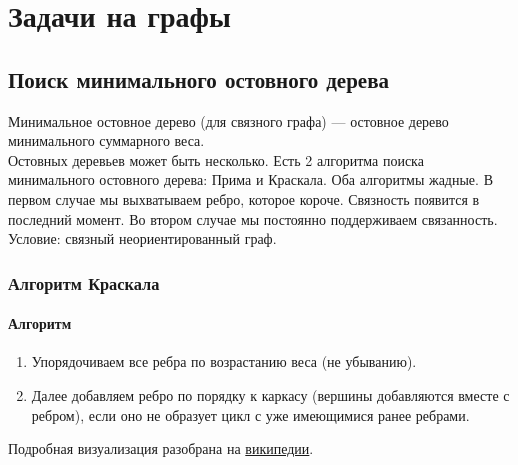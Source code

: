 \chapter{Задачи на графы}
\section{Поиск минимального остовного дерева}
Минимальное остовное дерево (для связного графа) --- остовное дерево минимального суммарного веса. \\
Остовных деревьев может быть несколько. Есть 2 алгоритма поиска минимального остовного дерева: Прима и Краскала. 
Оба алгоритмы жадные. В первом случае мы выхватываем ребро, которое короче. Связность появится в последний момент. Во втором случае мы постоянно поддерживаем связанность.
Условие: связный неориентированный граф.
\subsection{Алгоритм Краскала}
\subsubsection{Алгоритм}
\begin{enumerate}
\item Упорядочиваем все ребра по возрастанию веса (не убыванию).
\item Далее добавляем ребро по порядку к каркасу (вершины добавляются вместе с ребром), если оно не образует цикл с уже имеющимися  ранее ребрами.
\end{enumerate}
Подробная визуализация разобрана на \href{https://ru.wikipedia.org/wiki/%D0%90%D0%BB%D0%B3%D0%BE%D1%80%D0%B8%D1%82%D0%BC_%D0%9A%D1%80%D0%B0%D1%81%D0%BA%D0%B0%D0%BB%D0%B0}{википедии}.
